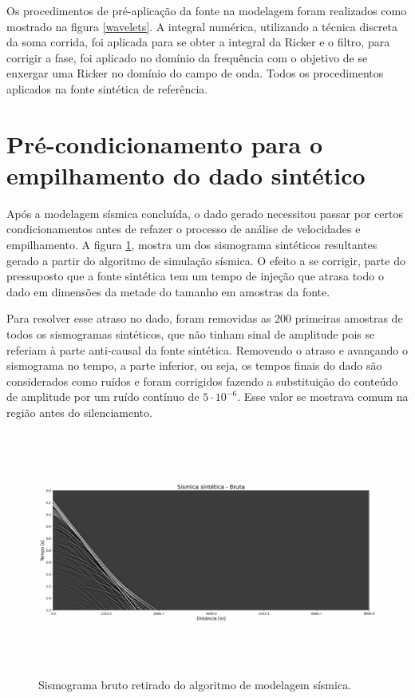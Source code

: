 \documentclass[
	12pt,				%
	openright,			%
	oneside,			%
	a4paper,			%
	english,			%
	brazil				%
	]{abntex2}
\begin{document}
	\newpage
	Os procedimentos de pré-aplicação da fonte na modelagem foram realizados como mostrado na figura \ref{wavelets}. A integral numérica, utilizando a técnica discreta da soma corrida, foi aplicada para se obter a integral da Ricker e o filtro, para corrigir a fase, foi aplicado no domínio da frequência com o objetivo de se enxergar uma Ricker no domínio do campo de onda. Todos os procedimentos aplicados na fonte sintética de referência. 	

\section{Pré-condicionamento para o empilhamento do dado sintético}

	Após a modelagem sísmica concluída, o dado gerado necessitou passar por certos condicionamentos antes de refazer o processo de análise de velocidades e empilhamento. A figura \ref{sismicaBruta}, mostra um dos sismograma sintéticos resultantes gerado a partir do algoritmo de simulação sísmica. O efeito a se corrigir, parte do pressuposto que a fonte sintética tem um tempo de injeção que atrasa todo o dado em dimensões da metade do tamanho em amostras da fonte. 

	Para resolver esse atraso no dado, foram removidas as 200 primeiras amostras de todos os sismogramas sintéticos, que não tinham sinal de amplitude pois se referiam à parte anti-causal da fonte sintética. Removendo o atraso e avançando o sismograma no tempo, a parte inferior, ou seja, os tempos finais do dado são considerados como ruídos e foram corrigidos fazendo a substituição do conteúdo de amplitude por um ruído contínuo de $5 \cdot 10^{-6}$. Esse valor se mostrava comum na região antes do silenciamento.   

	\begin{figure}[htp!]
		\centering
		\includegraphics[width=16cm,height=8cm]{../imagens/sismicaSinteticaBruta.png}
		\caption{Sismograma bruto retirado do algoritmo de modelagem sísmica.}
		\label{sismicaBruta}
	\end{figure}
\end{document}
